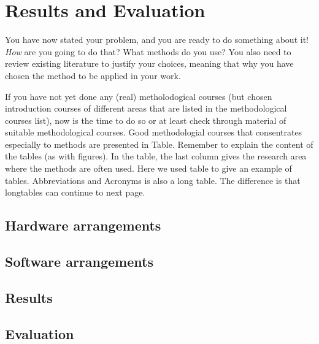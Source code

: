 
\chapter{Results and Evaluation}
\label{chapter:Results and Evaluation}

You have now stated your problem, and you are ready to do something
about it!  \emph{How} are you going to do that? What methods do you
use?  You also need to review existing literature to justify your
choices, meaning that why you have chosen the method to be applied in
your work.

If you have not yet done any (real) metholodogical courses (but chosen introduction courses of different areas that are listed in the
methodological courses list), now is the time to do so or at least
check through material of suitable methodological courses. Good
methodologial courses that consentrates especially to methods are
presented in Table. Remember to explain the
content of the tables (as with figures). In the table, the last column gives the research area where the methods are often used. Here we used table to give an example of tables. Abbreviations and Acronyms is also a long table. The difference is that longtables can continue to next page.

\section{Hardware arrangements}
\label{section:Hardware arrangements}

\section{Software arrangements}
\label{section:Software arrangements}

\section{Results}
\label{section:Results}

\section{Evaluation}
\label{section:Evaluation}

